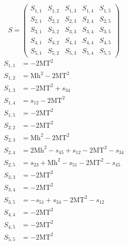 \documentclass[a4paper]{article}
\begin{document}
\begin{equation}
S=\left(\begin{array}{ccccc}
   S_{1,1}&
   S_{1,2}&
   S_{1,3}&
   S_{1,4}&
   S_{1,5}\\
   S_{2,1}&
   S_{2,2}&
   S_{2,3}&
   S_{2,4}&
   S_{2,5}\\
   S_{3,1}&
   S_{3,2}&
   S_{3,3}&
   S_{3,4}&
   S_{3,5}\\
   S_{4,1}&
   S_{4,2}&
   S_{4,3}&
   S_{4,4}&
   S_{4,5}\\
   S_{5,1}&
   S_{5,2}&
   S_{5,3}&
   S_{5,4}&
   S_{5,5}\end{array}\right)
\end{equation}
\begin{subequations}
\begin{align}
   S_{1,1}&=-2\text{MT}^2\\
   S_{1,2}&=\text{Mh}^2-2\text{MT}^2\\
   S_{1,3}&=-2\text{MT}^2+s_{34}\\
   S_{1,4}&=s_{12}-2\text{MT}^2\\
   S_{1,5}&=-2\text{MT}^2\\
   S_{2,2}&=-2\text{MT}^2\\
   S_{2,3}&=\text{Mh}^2-2\text{MT}^2\\
   S_{2,4}&=2\text{Mh}^2-s_{45}+s_{12}-2\text{MT}^2-s_{34}\\
   S_{2,5}&=s_{23}+\text{Mh}^2-s_{51}-2\text{MT}^2-s_{45}\\
   S_{3,3}&=-2\text{MT}^2\\
   S_{3,4}&=-2\text{MT}^2\\
   S_{3,5}&=-s_{51}+s_{34}-2\text{MT}^2-s_{12}\\
   S_{4,4}&=-2\text{MT}^2\\
   S_{4,5}&=-2\text{MT}^2\\
   S_{5,5}&=-2\text{MT}^2
\end{align}
\end{subequations}
\end{document}

